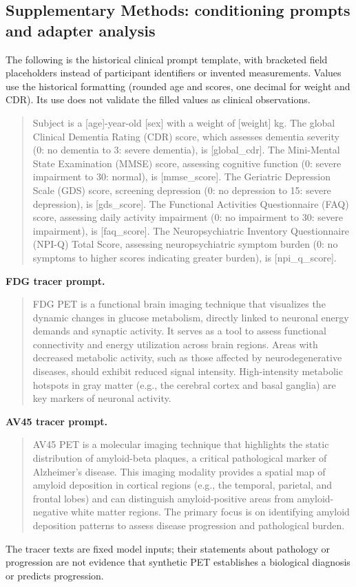 \documentclass{article}
\begin{document}
\subsection*{Supplementary Methods: conditioning prompts and adapter analysis}
The following is the historical clinical prompt template, with bracketed field placeholders instead of participant identifiers or invented measurements. Values use the historical formatting (rounded age and scores, one decimal for weight and CDR). Its use does not validate the filled values as clinical observations.
\begin{quote}\small
Subject is a [age]-year-old [sex] with a weight of [weight] kg. The global Clinical Dementia Rating (CDR) score, which assesses dementia severity (0: no dementia to 3: severe dementia), is [global\_cdr]. The Mini-Mental State Examination (MMSE) score, assessing cognitive function (0: severe impairment to 30: normal), is [mmse\_score]. The Geriatric Depression Scale (GDS) score, screening depression (0: no depression to 15: severe depression), is [gds\_score]. The Functional Activities Questionnaire (FAQ) score, assessing daily activity impairment (0: no impairment to 30: severe impairment), is [faq\_score]. The Neuropsychiatric Inventory Questionnaire (NPI-Q) Total Score, assessing neuropsychiatric symptom burden (0: no symptoms to higher scores indicating greater burden), is [npi\_q\_score].
\end{quote}
\noindent\textbf{FDG tracer prompt.}
\begin{quote}\small
FDG PET is a functional brain imaging technique that visualizes the dynamic changes in glucose metabolism, directly linked to neuronal energy demands and synaptic activity. It serves as a tool to assess functional connectivity and energy utilization across brain regions. Areas with decreased metabolic activity, such as those affected by neurodegenerative diseases, should exhibit reduced signal intensity. High-intensity metabolic hotspots in gray matter (e.g., the cerebral cortex and basal ganglia) are key markers of neuronal activity. 
\end{quote}
\noindent\textbf{AV45 tracer prompt.}
\begin{quote}\small
AV45 PET is a molecular imaging technique that highlights the static distribution of amyloid-beta plaques, a critical pathological marker of Alzheimer's disease. This imaging modality provides a spatial map of amyloid deposition in cortical regions (e.g., the temporal, parietal, and frontal lobes) and can distinguish amyloid-positive areas from amyloid-negative white matter regions. The primary focus is on identifying amyloid deposition patterns to assess disease progression and pathological burden.
\end{quote}
The tracer texts are fixed model inputs; their statements about pathology or progression are not evidence that synthetic PET establishes a biological diagnosis or predicts progression.
\end{document}

